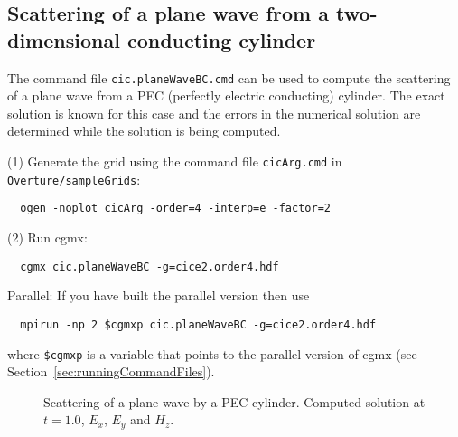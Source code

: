 \clearpage
\subsection{Scattering of a plane wave from a two-dimensional conducting cylinder} \label{sec:cyl2dScat}



The command file {\tt cic.planeWaveBC.cmd} can be used to compute the scattering
of a plane wave from a PEC (perfectly electric conducting) cylinder. The exact solution is known for this case
and the errors in the numerical solution are determined while the solution
is being computed.


\noindent (1) Generate the grid using the command file {\tt cicArg.cmd} in {\tt Overture/sampleGrids}:
\begin{verbatim}
  ogen -noplot cicArg -order=4 -interp=e -factor=2
\end{verbatim}

\noindent (2) Run cgmx: 
\begin{verbatim}
  cgmx cic.planeWaveBC -g=cice2.order4.hdf
\end{verbatim}

\noindent Parallel: If you have built the parallel version then use 
\begin{verbatim}
  mpirun -np 2 $cgmxp cic.planeWaveBC -g=cice2.order4.hdf
\end{verbatim} %
where {\tt \$cgmxp} is a variable that points to the parallel version of cgmx (see Section~\ref{sec:runningCommandFiles}).

{
\begin{figure}[hbt]
\newcommand{\figWidth}{5.5cm}
\newcommand{\trimfig}[2]{\trimFig{#1}{#2}{0.1}{0.05}{.05}{.05}}
\begin{center}
\end{center}
\caption{Scattering of a plane wave by a PEC cylinder. Computed solution at $t=1.0$, $E_x$, $E_y$ and $H_z$.}
\label{fig:cyl2dScat}
\end{figure}
}

